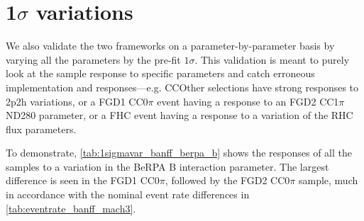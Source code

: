 \section{1$\sigma$ variations}
We also validate the two frameworks on a parameter-by-parameter basis by varying all the parameters by the pre-fit $1\sigma$. This validation is meant to purely look at the sample response to specific parameters and catch erroneous implementation and \pmu \cosmu responses---e.g. CCOther selections have strong responses to 2p2h variations, or a FGD1 CC0$\pi$ event having a response to an FGD2 CC1$\pi$ ND280 parameter, or a FHC \numu event having a response to a variation of the RHC flux parameters.

To demonstrate, \autoref{tab:1sigmavar_banff_berpa_b} shows the responses of all the samples to a variation in the BeRPA B interaction parameter. The largest difference is seen in the FGD1 CC0$\pi$, followed by the FGD2 CC0$\pi$ sample, much in accordance with the nominal event rate differences in \autoref{tab:eventrate_banff_mach3}.
